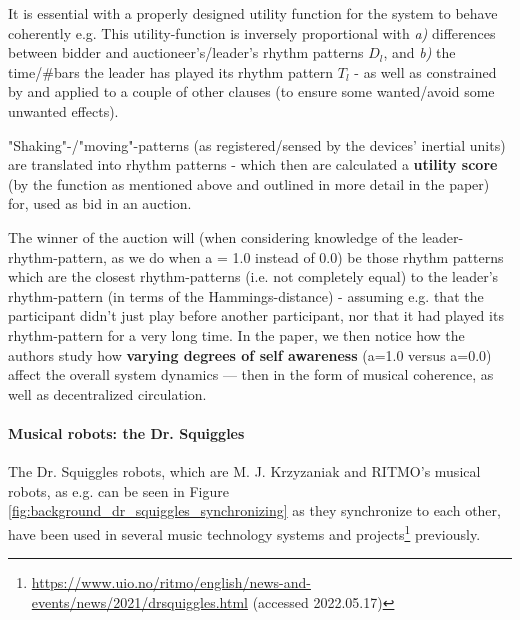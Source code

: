 			It is essential with a properly designed utility function for the system to behave coherently e.g. This utility-function is inversely proportional with \textit{a)} differences between bidder and auctioneer's/leader's rhythm patterns $D_l$, and \textit{b)} the time/\#bars the leader has played its rhythm pattern $T_l$ - as well as constrained by and applied to a couple of other clauses (to ensure some wanted/avoid some unwanted effects).

			"Shaking"-/"moving"-patterns (as registered/sensed by the devices' inertial units) are translated into rhythm patterns - which then are calculated a \textbf{utility score} (by the function as mentioned above and outlined in more detail in the paper) for, used as bid in an auction.

			The winner of the auction will (when considering knowledge of the leader-rhythm-pattern, as we do when a = 1.0 instead of 0.0) be those rhythm patterns which are the closest rhythm-patterns (i.e. not completely equal) to the leader's rhythm-pattern (in terms of the Hammings-distance) - assuming e.g. that the participant didn't just play before another participant, nor that it had played its rhythm-pattern for a very long time. In the paper, we then notice how the authors study how \textbf{varying degrees of self awareness} (a=1.0 versus a=0.0) affect the overall system dynamics — then in the form of musical coherence, as well as decentralized circulation.

			
			\paragraph{Musical robots: the Dr. Squiggles \nl}
			\label{dr_squiggles}
			
			The Dr. Squiggles robots, which are M. J. Krzyzaniak and RITMO's musical robots, as e.g. can be seen in Figure \ref{fig:background_dr_squiggles_synchronizing} as they synchronize to each other, have been used in several music technology systems and projects\footnote{\url{https://www.uio.no/ritmo/english/news-and-events/news/2021/drsquiggles.html} (accessed 2022.05.17)} previously.
			
